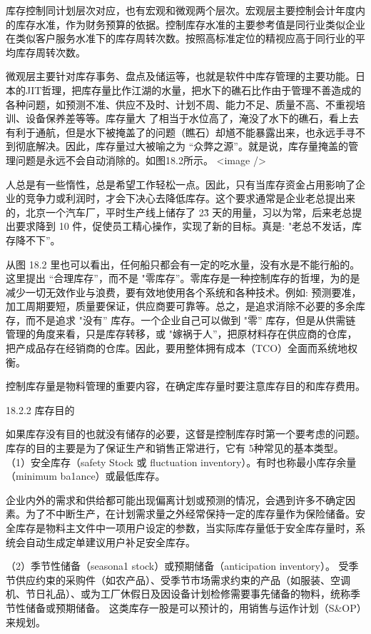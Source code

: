     库存控制同计划层次对应，也有宏观和微观两个层次。宏观层主要控制会计年度内的库存水准，作为财务预算的依据。控制库存水准的主要参考值是同行业类似企业在类似客户服务水准下的库存周转次数。按照高标准定位的精视应高于同行业的平均库存周转次数。

    微观层主要针对库存事务、盘点及储运等，也就是软件中库存管理的主要功能。日本的JIT哲理，把库存量比作江湖的水量，把水下的礁石比作由于管理不善造成的各种问题，如预测不准、供应不及时、计划不周、能力不足、质量不高、不重视培训、设备保养差等等。库存量大
了相当于水位高了，淹没了水下的礁石，看上去有利于通航，但是水下被掩盖了的问题（瞧石）却馗不能暴露出来，也永远手寻不到彻底解决。因此，库存量过大被喻之为 “众弊之源”。就是说，库存量掩盖的管理问题是永远不会自动消除的。如图18.2所示。
    <image />

    人总是有一些惰性，总是希望工作轻松一点。因此，只有当库存资金占用影响了企业的竞争力或利润时，才会下决心去降低库存。这个要求通常是企业老总提出来的，北京一个汽车厂，平时生产线上储存了 2\~3 天的用量，习以为常，后来老总提出要求降到 10 件，促使员工精心操作，实现了新的目标。真是: "老总不发话，库存降不下”。

    从图 18.2 里也可以看出，任何船只都会有一定的吃水量，没有水是不能行船的。这里提出 “合理库存”，而不是 "零库存”。零库存是一种控制库存的哲埋，为的是减少一切无效作业与浪费，要有效地使用各个系统和各种技术。例如: 预测要准，加工周期要短，质量要保证，供应商要可靠等。总之，是追求消除不必要的多余库存，而不是追求 "没有” 库存。一个企业自己可以做到 "零” 库存，但是从供需链管理的角度来看，只是库存转移，或 "嫁祸于人”，把原材料存在供应商的仓库，把产成品存在经销商的仓库。因此，要用整体拥有成本（TCO）全面而系统地权衡。

    控制库存量是物料管理的重要内容，在确定库存量时要注意库存目的和库存费用。

18.2.2 库存目的

    如果库存没有目的也就没有储存的必要，这督是控制库存时第一个要考虑的问题。库存的目的主要是为了保证生产和销售正常进行，它有 5种常见的基本类型。
    （1）安全库存（safety Stock 或 ﬂuctuation inventory）。有时也称最小库存余量（minimum ba1ance）或最低库存。

    企业内外的需求和供给都可能出现偏离计划或预测的情况，会遇到许多不确定因素。为了不中断生产，在计划需求量之外经常保持一定的库存量作为保险储备。安全库存是物料主文件中一项用户设定的参数，当实际库存量低于安全库存量时，系统会自动生成定单建议用户补足安全库存。

    （2）季节性储备（seasona1 stock）或预期储备（anticipation inventory）。 受季节供应约束的采购件（如农产品）、受季节市场需求约束的产品（如服装、空调机、节日礼品）、或为工厂休假日及因设备计划检修需要事先储备的物料，统称季节性储备或预期储备。 这类库存一股是可以预计的，用销售与运作计划（S&OP）来规划。

